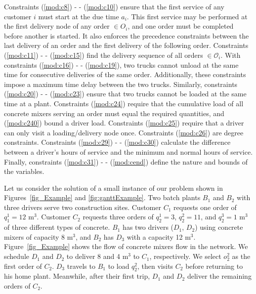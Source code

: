 \documentclass{article}
\begin{document}
Constraints (\ref{mod:c8}) - - (\ref{mod:c10}) ensure that the first service of any customer $i$ must start at the due time $a_i$. This first service may be performed at the first delivery node of any order $\in O_i$, and one order must be completed before another is started. It also enforces the precedence constraints between the last delivery of an order and the first delivery of the following order.
Constraints (\ref{mod:c11}) - - (\ref{mod:c15}) find the delivery sequence of all orders $\in \mathcal{O}_i$. With constraints (\ref{mod:c16}) - - (\ref{mod:c19}), two trucks cannot unload at the same time for consecutive deliveries of the same order. Additionally, these constraints impose a maximum time delay between the two trucks. Similarly, constraints (\ref{mod:c20}) - - (\ref{mod:c23}) ensure that two trucks cannot be loaded at the same time at a plant. Constraints (\ref{mod:c24}) require that the cumulative load of all concrete mixers serving an order must equal the required quantities, and (\ref{mod:c240}) bound a driver load.  Constraints (\ref{mod:c25}) require that a driver can only visit a loading/delivery node once. Constraints (\ref{mod:c26}) are degree constraints. Constraints (\ref{mod:c29}) - - (\ref{mod:c30}) calculate the difference between a driver's hours of service and the minimum and normal hours of service. Finally, constraints (\ref{mod:c31}) - - (\ref{mod:cend}) define the nature and bounds of the variables.

Let us consider the solution of a small instance of our problem shown in Figures~\ref{fig_Example} and \ref{fig:ganttExample}. Two batch plants $B_1$ and $B_2$ with three drivers serve two construction sites. Customer $C_1$ requests one order of $q^1_1=12$ m$^3$. Customer $C_2$ requests three orders of $q^1_2=3$, $q^2_2=11$, and $q^3_2=1$ m$^3$ of three different types of concrete. $B_1$ has two drivers ($D_1$, $D_2$) using concrete mixers of capacity 8 m$^3$, and $B_2$ has $D_3$ with a capacity 12 m$^3$. Figure~\ref{fig_Example} shows the flow of concrete mixers flow in the network. We schedule $D_1$ and $D_2$ to deliver 8 and 4 m$^3$ to $C_1$, respectively. We select $o^2_2$ as the first order of $C_2$. $D_3$ travels to $B_1$ to load $q^2_2$, then visits $C_2$ before returning to his home plant. Meanwhile, after their first trip,  $D_1$ and $D_2$ deliver the remaining orders of $C_2$.
\end{document}
